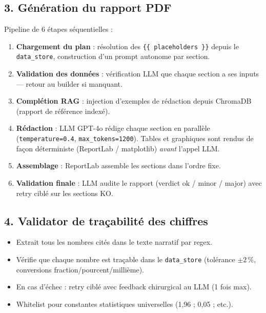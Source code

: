 \documentclass[12pt,a4paper]{article}
\begin{document}
\begin{capabilitybox}
\subsection*{3. Génération du rapport PDF}
Pipeline de 6 étapes séquentielles :
\begin{enumerate}[leftmargin=1.5em]
  \item \textbf{Chargement du plan} : résolution des \texttt{\{\{\ placeholders\ \}\}} depuis le
        \texttt{data\_store}, construction d'un prompt autonome par section.
  \item \textbf{Validation des données} : vérification LLM que chaque section a ses inputs
        — retour au builder si manquant.
  \item \textbf{Complétion RAG} : injection d'exemples de rédaction depuis ChromaDB
        (rapport de référence indexé).
  \item \textbf{Rédaction} : LLM GPT-4o rédige chaque section en parallèle
        (\texttt{temperature=0.4}, \texttt{max\_tokens=1200}).
        Tables et graphiques sont rendus de façon déterministe (ReportLab / matplotlib)
        \emph{avant} l'appel LLM.
  \item \textbf{Assemblage} : ReportLab assemble les sections dans l'ordre fixe.
  \item \textbf{Validation finale} : LLM audite le rapport (verdict ok / minor / major)
        avec retry ciblé sur les sections KO.
\end{enumerate}

\subsection*{4. Validator de traçabilité des chiffres}
\begin{itemize}[leftmargin=1.5em]
  \item Extrait tous les nombres cités dans le texte narratif par regex.
  \item Vérifie que chaque nombre est traçable dans le \texttt{data\_store}
        (tolérance $\pm 2\,\%$, conversions fraction/pourcent/millième).
  \item En cas d'échec : retry ciblé avec feedback chirurgical au LLM (1 fois max).
  \item Whitelist pour constantes statistiques universelles (1,96 ; 0,05 ; etc.).
\end{itemize}


\end{capabilitybox}
\end{document}
